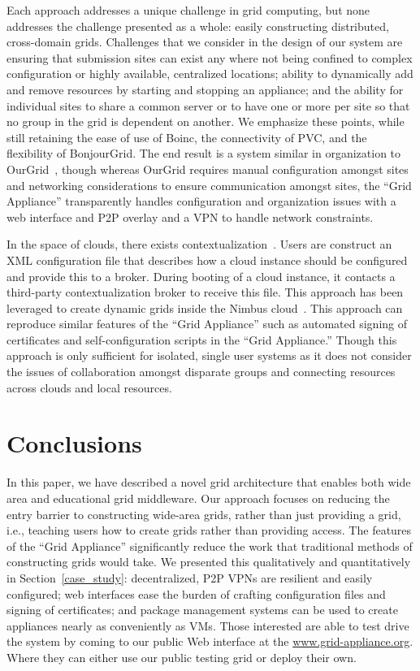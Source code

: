 \documentclass[conference]{IEEEtran}
\begin{document}
Each approach addresses a unique challenge in grid computing, but none
addresses the challenge presented as a whole: easily constructing distributed,
cross-domain grids.  Challenges that we consider in the design of our system
are ensuring that submission sites can exist any where not being confined to
complex configuration or highly available, centralized locations; ability to
dynamically add and remove resources by starting and stopping an appliance; and
the ability for individual sites to share a common server or to have one or
more per site so that no group in the grid is dependent on another.  We
emphasize these points, while still retaining the ease of use of Boinc, the
connectivity of PVC, and the flexibility of BonjourGrid.  The end result is a
system similar in organization to OurGrid~\cite{ourgrid}, though whereas
OurGrid requires manual configuration amongst sites and networking
considerations to ensure communication amongst sites, the ``Grid Appliance''
transparently handles configuration and organization issues with a web
interface and P2P overlay and a VPN to handle network constraints.

In the space of clouds, there exists contextualization~\cite{context}.  Users
are construct an XML configuration file that describes how a cloud instance
should be configured and provide this to a broker.  During booting of a cloud
instance, it contacts a third-party contextualization broker to receive this
file.  This approach has been leveraged to create dynamic grids inside the
Nimbus cloud~\cite{alien_grid}.  This approach can reproduce similar features
of the ``Grid Appliance'' such as automated signing of certificates and
self-configuration scripts in the ``Grid Appliance.'' Though this approach is
only sufficient for isolated, single user systems as it does not consider the
issues of collaboration amongst disparate groups and connecting resources
across clouds and local resources.

\section{Conclusions}
\label{conclusions}

In this paper, we have described a novel grid architecture that enables both
wide area and educational grid middleware.  Our approach focuses on reducing
the entry barrier to constructing wide-area grids, rather than just providing a
grid, i.e., teaching users how to create grids rather than providing access.
The features of the ``Grid Appliance'' significantly reduce the work that
traditional methods of constructing grids would take.  We presented this
qualitatively and quantitatively in Section~\ref{case_study}:  decentralized,
P2P VPNs are resilient and easily configured; web interfaces ease the burden of
crafting configuration files and signing of certificates; and package
management systems can be used to create appliances nearly as conveniently as
VMs.  Those interested are able to test drive the system by coming to our
public Web interface at the \url{www.grid-appliance.org}.  Where they can
either use our public testing grid or deploy their own.
\end{document}
